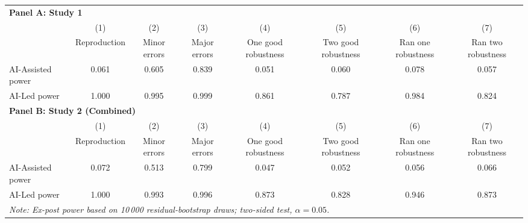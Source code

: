 \begin{tabular}{l*{7}{c}}
\hline\hline
\multicolumn{8}{l}{\textbf{Panel A: Study 1}}\\
& (1) & (2) & (3) & (4) & (5) & (6) & (7)\\
                    &Reproduction   &Minor errors   &Major errors   &One good robustness   &Two good robustness   &Ran one robustness   &Ran two robustness   \\
\hline
AI-Assisted power    &0.061 & 0.605 & 0.839 & 0.051 & 0.060 & 0.078 & 0.057 \\
AI-Led power         &1.000 & 0.995 & 0.999 & 0.861 & 0.787 & 0.984 & 0.824 \\
\hline
\multicolumn{8}{l}{\textbf{Panel B: Study 2 (Combined)}}\\
& (1) & (2) & (3) & (4) & (5) & (6) & (7)\\
                    &Reproduction   &Minor errors   &Major errors   &One good robustness   &Two good robustness   &Ran one robustness   &Ran two robustness   \\
\hline
AI-Assisted power    &0.072 & 0.513 & 0.799 & 0.047 & 0.052 & 0.056 & 0.066 \\
AI-Led power         &1.000 & 0.993 & 0.996 & 0.873 & 0.828 & 0.946 & 0.873 \\
\hline
\hline\hline
\multicolumn{8}{l}{\it{Note:} Ex-post power based on 10\,000  residual-bootstrap draws; two-sided test, \(\alpha = 0.05\).}\\
\end{tabular}
